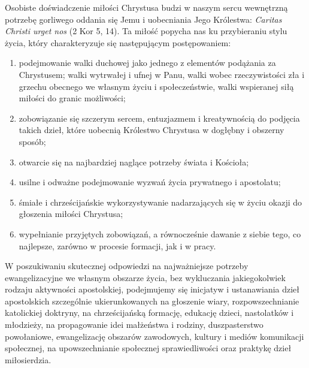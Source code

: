  
 Osobiste doświadczenie miłości Chrystusa budzi w naszym sercu wewnętrzną potrzebę gorliwego oddania się Jemu i uobecniania Jego Królestwa: {\em Caritas Christi urget nos} (2 Kor 5, 14). Ta miłość popycha nas ku przybieraniu stylu życia, który charakteryzuje się następującym postępowaniem:


\begin{enumerate}


\item podejmowanie walki duchowej jako jednego z elementów podążania za Chrystusem; walki wytrwałej i ufnej w Panu, walki wobec rzeczywistości zła i grzechu obecnego we własnym życiu i społeczeństwie, walki wspieranej siłą miłości do granic możliwości;


\item zobowiązanie się szczerym sercem, entuzjazmem i kreatywnością do podjęcia takich dzieł, które uobecnią Królestwo Chrystusa w dogłębny i obszerny sposób;


\item otwarcie się na najbardziej naglące potrzeby świata i Kościoła;


\item usilne i odważne podejmowanie wyzwań życia prywatnego i apostolatu;


\item śmiałe i chrześcijańskie wykorzystywanie nadarzających się w życiu okazji do głoszenia miłości Chrystusa;


\item wypełnianie przyjętych zobowiązań, a równocześnie dawanie z siebie tego, co najlepsze, zarówno w procesie formacji, jak i w pracy.


\end{enumerate}


 
 W poszukiwaniu skutecznej odpowiedzi na najważniejsze potrzeby ewangelizacyjne we własnym obszarze życia, bez wykluczania jakiegokolwiek rodzaju aktywności apostolskiej, podejmujemy się inicjatyw i ustanawiania dzieł apostolskich szczególnie ukierunkowanych na głoszenie wiary, rozpowszechnianie katolickiej doktryny, na chrześcijańską formację, edukację dzieci, nastolatków i młodzieży, na propagowanie idei małżeństwa i rodziny, duszpasterstwo powołaniowe, ewangelizację obszarów zawodowych, kultury i mediów komunikacji społecznej, na upowszechnianie społecznej sprawiedliwości oraz praktykę dzieł miłosierdzia.




